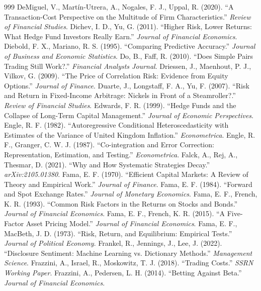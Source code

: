 \begin{thebibliography}{999}
 DeMiguel, V., Martín-Utrera, A., Nogales, F. J., Uppal, R. (2020). ``A Transaction-Cost Perspective on the Multitude of Firm Characteristics.'' \textit{Review of Financial Studies}.
 Dichev, I. D., Yu, G. (2011). ``Higher Risk, Lower Returns: What Hedge Fund Investors Really Earn.'' \textit{Journal of Financial Economics}.
 Diebold, F. X., Mariano, R. S. (1995). ``Comparing Predictive Accuracy.'' \textit{Journal of Business and Economic Statistics}.
 Do, B., Faff, R. (2010). ``Does Simple Pairs Trading Still Work?.'' \textit{Financial Analysts Journal}.
 Driessen, J., Maenhout, P. J., Vilkov, G. (2009). ``The Price of Correlation Risk: Evidence from Equity Options.'' \textit{Journal of Finance}.
 Duarte, J., Longstaff, F. A., Yu, F. (2007). ``Risk and Return in Fixed-Income Arbitrage: Nickels in Front of a Steamroller?.'' \textit{Review of Financial Studies}.
 Edwards, F. R. (1999). ``Hedge Funds and the Collapse of Long-Term Capital Management.'' \textit{Journal of Economic Perspectives}.
 Engle, R. F. (1982). ``Autoregressive Conditional Heteroscedasticity with Estimates of the Variance of United Kingdom Inflation.'' \textit{Econometrica}.
 Engle, R. F., Granger, C. W. J. (1987). ``Co-integration and Error Correction: Representation, Estimation, and Testing.'' \textit{Econometrica}.
 Falck, A., Rej, A., Thesmar, D. (2021). ``Why and How Systematic Strategies Decay.'' \textit{arXiv:2105.01380}.
 Fama, E. F. (1970). ``Efficient Capital Markets: A Review of Theory and Empirical Work.'' \textit{Journal of Finance}.
 Fama, E. F. (1984). ``Forward and Spot Exchange Rates.'' \textit{Journal of Monetary Economics}.
 Fama, E. F., French, K. R. (1993). ``Common Risk Factors in the Returns on Stocks and Bonds.'' \textit{Journal of Financial Economics}.
 Fama, E. F., French, K. R. (2015). ``A Five-Factor Asset Pricing Model.'' \textit{Journal of Financial Economics}.
 Fama, E. F., MacBeth, J. D. (1973). ``Risk, Return, and Equilibrium: Empirical Tests.'' \textit{Journal of Political Economy}.
 Frankel, R., Jennings, J., Lee, J. (2022). ``Disclosure Sentiment: Machine Learning vs. Dictionary Methods.'' \textit{Management Science}.
 Frazzini, A., Israel, R., Moskowitz, T. J. (2018). ``Trading Costs.'' \textit{SSRN Working Paper}.
 Frazzini, A., Pedersen, L. H. (2014). ``Betting Against Beta.'' \textit{Journal of Financial Economics}.

\end{thebibliography}
